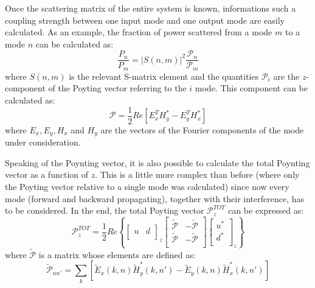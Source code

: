 \documentclass[a4paper,10pt]{report}
\begin{document}
Once the scattering matrix of the entire system is known, informations such a coupling strength between one input mode  and one output mode are easily calculated. As an example, the fraction of power scattered from a mode $m$ to a mode $n$ can be calculated as:
\begin{equation} \label{eq:cacl_stattering}
\frac{P_n}{P_m}=|S(n,m)|^2 \frac{\mathcal{P}_n}{\mathcal{P}_m}
\end{equation}
where $S(n,m)$ is the relevant S-matrix element and the quantities $\mathcal{P}_i$ are the $z$-component of the Poyting vector referring to the $i$ mode. This component can be calculated as:
\begin{equation} \label{eq:poynting_mode}
\mathcal{P}= \frac{1}{2} Re \left[ E_x^TH_y^*-E_y^TH_x^* \right]
\end{equation}
where $E_x,E_y,H_x$ and $H_y$ are the vectors of the Fourier components of the mode under consideration. 

Speaking of the Poynting vector, it is also possible to calculate the total Poynting vector as a function of $z$. This is a little more complex than before (where only the Poyting vector relative to a single mode was calculated) since now every mode (forward and backward propagating), together with their interference, has to be considered. In the end, the total Poyting vector $\mathcal{P}^{TOT}_z$ can be expressed as:
\begin{equation} \label{Poynting_tot}
\mathcal{P}^{TOT}_z= \frac{1}{2} Re \left\{
\left[ \begin{array}{cc} u & d \\  \end{array} \right]_z
\left[ \begin{array}{cc} \tilde{\mathcal{P}} & -\tilde{\mathcal{P}} \\ \tilde{\mathcal{P}} & -\tilde{\mathcal{P}} \\  \end{array} \right]
\left[ \begin{array}{c} u^* \\ d^* \\  \end{array} \right]_z \right\}
\end{equation}
where $\tilde{\mathcal{P}}$ is a matrix whose elements are defined as:
\begin{equation} \label{eq:P_matrix}
\tilde{\mathcal{P}}_{nn'} = \sum_k \left[ \tilde{E}_x(k,n)\tilde{H}_y^*(k,n') - \tilde{E}_y(k,n)\tilde{H}_x^*(k,n') \right]
\end{equation}
\end{document}
